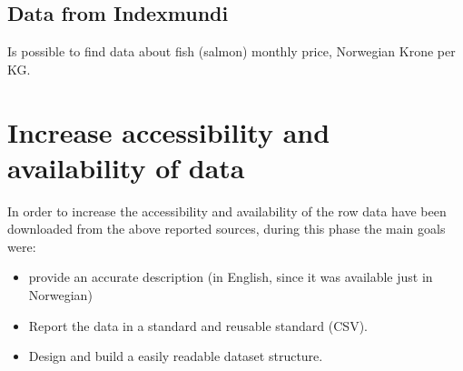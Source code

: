 \newpage


\subsection{Data from Indexmundi} 
Is possible to find data about fish (salmon) monthly price, Norwegian Krone per KG.\\

\begin{table}[ht]
     \caption{Data provided from Indexmundi.}
    \label{table: Indemundi_Data} 
\end{table}  

\section{Increase accessibility and availability of data}
In order to increase the accessibility and availability of the row data have been downloaded from the above reported sources, during this phase the main goals were:
\begin{itemize}
\item provide an accurate description (in English, since it was available just in Norwegian)
\item Report the data in a standard and reusable standard (CSV).
\item Design and build a easily readable dataset structure.
\end{itemize} 

